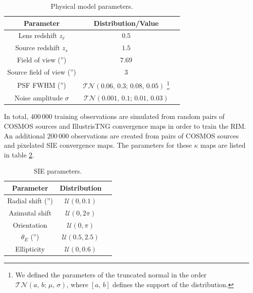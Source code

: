 \begin{table}[htb!]
\centering
\caption{Physical model parameters.}
\label{tab:phys}
\begin{tabular}{ccc}
        Parameter &  Distribution/Value \\
        \hline \hline
        Lens redshift $z_\ell$ & $0.5$ \\
        Source redshift $z_s$ & $1.5$ \\
        Field of view ('') & $7.69$ \\
        Source field of view ('') & $3$ \\
        PSF FWHM ('') & $\mathcal{TN}(0.06,\, 0.3;\, 0.08,\, 0.05)$
        \footnote{We defined the parameters of the truncated normal in the order $\mathcal{TN}(a,\, b;\, \mu,\, \sigma)$, where $[a,\, b]$ defines the support of the distribution.} \\
        Noise amplitude $\sigma$ & $\mathcal{TN}(0.001,\, 0.1;\, 0.01,\,0.03)$\\
        \hline
\end{tabular}
\end{table}

In total, $400\,000$ training observations are simulated from random pairs of COSMOS sources 
and IllustrisTNG convergence maps in order to train the RIM. 
An additional $200\,000$ observations are created from pairs 
of COSMOS sources and pixelated SIE convergence maps. 
The parameters for these $\kappa$ maps are listed in table \ref{tab:sie}. 

\begin{table}[htb!]
\centering
\caption{SIE parameters.}
\label{tab:sie}
\begin{tabular}{ccc}
        Parameter &  Distribution \\
        \hline \hline
         Radial shift ('') & $\mathcal{U}(0, 0.1)$ \\
        Azimutal shift & $\mathcal{U}(0, 2\pi)$ \\
        Orientation & $\mathcal{U}(0, \pi)$ \\
        $\theta_E$ ('') & $\mathcal{U}(0.5, 2.5)$ \\
        Ellipticity & $\mathcal{U}(0, 0.6)$ \\
        \hline
\end{tabular}
\end{table}


